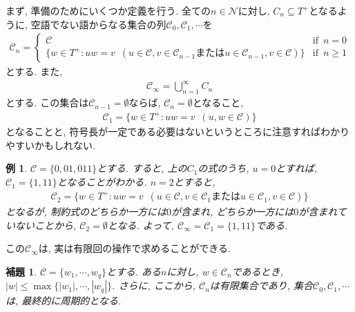 \documentclass[12pt]{ltjsarticle}
\newtheorem{example}{例}
\newtheorem{lemma}{補題}
\begin{document}
まず, 準備のためにいくつか定義を行う.
全ての$n \in \mathcal{N}$に対し, $C_n \subseteq T^+$となるように, 空語でない語からなる集合の列$\mathcal{C}_0, \mathcal{C}_1, \cdots$を
\begin{align*}
  \mathcal{C}_n =
    \begin{cases}
      \mathcal{C} & \text{if} \enspace n = 0 \\
      \{w \in T^+ : uw = v \enspace (u \in \mathcal{C}, v \in \mathcal{C}_{n - 1} \text{または} u \in \mathcal{C}_{n - 1}, v \in \mathcal{C})\} & \text{if} \enspace n \geq 1
    \end{cases}
\end{align*}
とする.
また,
\begin{align*}
  \mathcal{C}_\infty = \bigcup_{n = 1}^\infty C_n
\end{align*}
とする.
この集合は$\mathcal{C}_{n - 1} = \emptyset$ならば, $\mathcal{C}_n = \emptyset$となること,
\begin{align*}
  \mathcal{C}_1 = \{w \in T^+ : uw = v \enspace (u, w \in \mathcal{C})\}
\end{align*}
となることと, 符号長が一定である必要はないというところに注意すればわかりやすいかもしれない.
\begin{example}
  $\mathcal{C} = \{0, 01, 011\}$とする.
  すると, 上の$C_1$の式のうち, $u = 0$とすれば, $\mathcal{C}_1 = \{1, 11\}$となることがわかる.
  $n = 2$とすると,
  \begin{align*}
    \mathcal{C}_2 = \{w \in T^+ : uw = v \enspace (u \in \mathcal{C}, v \in \mathcal{C}_1 または u \in \mathcal{C}_1, v \in \mathcal{C})\}
  \end{align*}
  となるが, 制約式のどちらか一方には$0$が含まれ, どちらか一方には$0$が含まれていないことから, $\mathcal{C}_2 = \emptyset$となる.
  よって, $\mathcal{C}_\infty = \mathcal{C}_1 = \{1, 11\}$である.
\end{example}
\noindent
この$\mathcal{C}_\infty$は, 実は有限回の操作で求めることができる.
\begin{screen}
  \begin{lemma}
    $\mathcal{C} = \{w_1, \cdots, w_q\}$とする.
    ある$n$に対し, $w \in \mathcal{C}_n$であるとき, $|w| \leq \max \{|w_1|, \cdots, |w_q|\}$.
    さらに, ここから, $\mathcal{C}_n$は有限集合であり, 集合$\mathcal{C}_0, \mathcal{C}_1, \cdots$は, 最終的に周期的となる.
  \end{lemma}
\end{screen}
\end{document}
